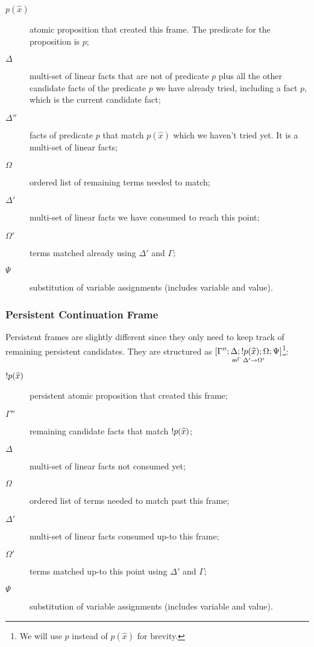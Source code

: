 \begin{description}

   \item[$p(\widehat{x})$] atomic proposition that created this
      frame. The predicate for the proposition is $p$;

   \item[$\Delta$] multi-set of linear facts that are not of predicate $p$ plus
      all the other candidate facts of the predicate $p$ we have already
      tried, including a fact $p$, which is the current candidate fact;

   \item[$\Delta''$] facts of predicate $p$ that match $p(\widehat{x})$ which we
      haven't tried yet. It is a multi-set of linear facts;


   \item[$\Omega$] ordered list of remaining terms needed to match;

   \item[$\Delta'$] multi-set of linear facts we have consumed to reach this point;

   \item[$\Omega'$] terms matched already using $\Delta'$ and $\Gamma$;
   \item[$\Psi$] substitution of variable assignments (includes variable and
      value).
\end{description}

\subsubsection{Persistent Continuation Frame}

Persistent frames are slightly different since they only need to keep track of
remaining persistent candidates. They are structured as
$\pframe{\Gamma''}{\Delta}{\bang
   p(\widehat{x})}{\Omega; \Psi}{\Delta'}{\Omega'}$\footnote{We will use $p$
      instead of $p(\widehat{x})$ for brevity.}:

\begin{description}
   \item[$\bang p(\widehat{x})$] persistent atomic proposition that created
      this frame;
   \item[$\Gamma''$] remaining candidate facts that match $\bang p(\widehat{x})$;
   \item[$\Delta$] multi-set of linear facts not consumed yet;

   \item[$\Omega$] ordered list of terms needed to match past this
   frame;

   \item[$\Delta'$] multi-set of linear facts consumed up-to this frame;
   \item[$\Omega'$] terms matched up-to this point using $\Delta'$ and $\Gamma$;
   \item[$\Psi$] substitution of variable assignments (includes variable and value).
\end{description}

